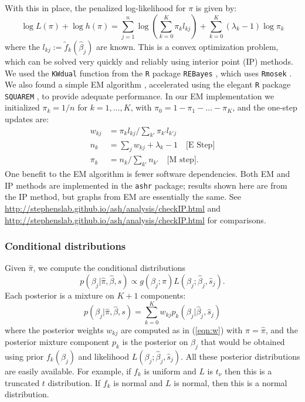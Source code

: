 \documentclass[11pt]{article}
\def\bhat{\hat{\beta}}
\def\shat{\hat{s}}
\begin{document}
With this in place, the penalized log-likelihood for $\pi$ is given by:
\begin{equation}
\log L(\pi) + \log h(\pi) = \sum_{j=1}^n \log(\sum_{k=0}^K \pi_k l_{kj}) + \sum_{k=0}^K (\lambda_k-1) \log \pi_k
\end{equation}
where the $l_{kj}:= \tilde{f}_k(\bhat_j)$ are known. This is a convex optimization problem, which
can be solved very quickly and reliably using interior point (IP) methods. We used the {\tt KWdual} function from the {\tt R} package {\tt REBayes} \cite{REBayes}, which uses {\tt Rmosek} \cite{Rmosek}. We also found a simple EM algorithm \cite{dempster77}, accelerated using the elegant {\tt R} package {\tt SQUAREM} \cite{varadhan2008simple},
to provide adequate performance. In our EM implementation we initialized $\pi_k=1/n$ for $k=1,\dots,K$, with $\pi_0=1-\pi_1-\dots-\pi_K$,
and the one-step updates are:
\begin{align} \label{eqn:w}
w_{kj} & = \pi_k l_{kj} / \sum_{k'} {\pi_{k'} l_{k'j}} \\
n_k & = \sum_j w_{kj} + \lambda_k - 1 \quad \text{[E Step]} \\
\pi_k &= n_k/\sum_{k'} n_{k'} \quad \text{[M step]}.
\end{align}
One benefit to the EM algorithm is fewer software dependencies.
Both EM and IP methods are implemented in the {\tt ashr} package; results shown here are from the IP method, but graphs from EM are essentially the same.
See \href{http://stephenslab.github.io/ash/analysis/checkIP.html}{http://stephenslab.github.io/ash/analysis/checkIP.html}  and \href{http://stephenslab.github.io/ash/analysis/IPvsEM.html}{http://stephenslab.github.io/ash/analysis/checkIP.html}  for comparisons.

\subsubsection*{Conditional distributions}

Given $\hat\pi$, we compute the conditional distributions 
\begin{equation}
p(\beta_j | \hat\pi, \bhat, s) \propto g(\beta_j; \pi) L(\beta_j; \bhat_j, \shat_j).
\end{equation} 
Each posterior is a mixture on $K+1$ components:
\begin{equation}
p(\beta_j | \hat\pi, \bhat, s) = \sum_{k=0}^K w_{kj} p_k(\beta_j | \bhat_j, \shat_j)
\end{equation}
where the posterior weights $w_{kj}$ are computed as in (\ref{eqn:w}) with $\pi=\hat\pi$,
and the posterior mixture component $p_k$ is the posterior on $\beta_j$ that would be obtained using prior 
$f_k(\beta_j)$ and likelihood $L(\beta_j; \bhat_j,\shat_j)$.
All these posterior distributions are easily available.
For example, if $f_k$ is uniform and $L$ is $t_\nu$ then this is a truncated $t$ distribution.
If $f_k$ is normal and $L$ is normal, then this is a normal distribution.
\end{document}
